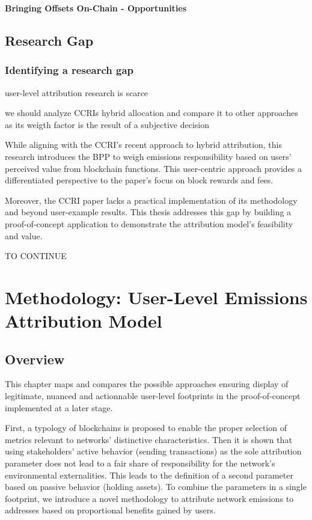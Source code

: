 \documentclass[11pt]{report}
\begin{document}
\textbf{Bringing Offsets On-Chain - Opportunities}






\section{Research Gap}

\subsection{Identifying a research gap}

user-level attribution research is scarce

we should analyze CCRIs hybrid allocation and compare it to other approaches as its weigth factor is the result of a subjective decision



While aligning with the CCRI's recent approach to hybrid attribution, this research introduces the \ac{BPP} to weigh emissions responsibility based on users' perceived value from blockchain functions. This user-centric approach provides a differentiated perspective to the paper's focus on block rewards and fees.

Moreover, the CCRI paper lacks a practical implementation of its methodology and beyond user-example results. This thesis addresses this gap by building a proof-of-concept application to demonstrate the attribution model's feasibility and value.

    {\large{TO CONTINUE}} 

\chapter{Methodology: User-Level Emissions Attribution Model}
\section{Overview \label{se:methodology_overview}}


This chapter maps and compares the possible approaches ensuring display of legitimate, nuanced and actionnable user-level footprints in the proof-of-concept implemented at a later stage.

First, a typology of blockchains is proposed to enable the proper selection of metrics relevant to networks' distinctive characteristics. Then it is shown that using stakeholders' active behavior (sending transactions) as the sole attribution parameter does not lead to a fair share of responsibility for the network's environmental externalities. This leads to the definition of a second parameter based on passive behavior (holding assets). To combine the parameters in a single footprint, we introduce a novel methodology to attribute network emissions to addresses based on proportional benefits gained by users.
\end{document}
